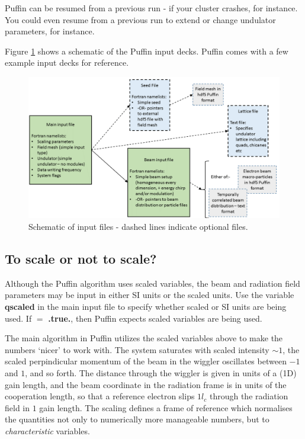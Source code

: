 \documentclass[12pt]{article}%
\begin{document}
Puffin can be resumed from a previous run - if your cluster crashes, for instance. You could even resume from a previous run to extend or change undulator parameters, for instance.

Figure \ref{inputs1} shows a schematic of the Puffin input decks. Puffin comes with a few example input decks for reference.

\begin{figure}
\centering
\includegraphics[width=120mm]{InputFiles.png}
\caption{Schematic of input files - dashed lines indicate optional files.}
\label{inputs1}
\end{figure}



\subsection{To scale or not to scale?}

Although the Puffin algorithm uses scaled variables, the beam and radiation field parameters may be input in either SI units or the scaled units. Use the variable {\bf qscaled} in the main input file to specify whether scaled or SI units are being used. If $=$ {\bf .true.}, then Puffin expects scaled variables are being used. %

The main algorithm in Puffin utilizes the scaled variables above to make the numbers `nicer' to work with. The system saturates with scaled intensity $\sim 1$, the scaled perpindicular momentum of the beam in the wiggler oscillates between $-1$ and $1$, and so forth. The distance through the wiggler is given in units of a (1D) gain length, and the beam coordinate in the radiation frame is in units of the cooperation length, so that a reference electron slips $1l_c$ through the radiation field in $1$ gain  length. The scaling defines a frame of reference which normalises the quantities not only to numerically more manageable numbers, but to \textit{characteristic} variables.
\end{document}
